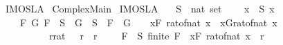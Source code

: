 %
\begin{isabellebody}%
%
%
\isadelimdocument
%
\endisadelimdocument
%
\isatagdocument
%
\isamarkuptrue%
%
\isamarkuptrue%
%
\endisatagdocument
{\isafolddocument}%
%
\isadelimdocument
%
\endisadelimdocument
%
\isadelimtheory
%
\endisadelimtheory
%
\isatagtheory
{}\isamarkupfalse%
\ IMO{\isacharunderscore}{}{}{}{}{\isacharunderscore}SL{\isacharunderscore}A{}\isanewline
{}\ Complex{\isacharunderscore}Main\isanewline
\isanewline
{}%
\endisatagtheory
{\isafoldtheory}%
%
\isadelimtheory
\isanewline
%
\endisadelimtheory
\isanewline
{}\isamarkupfalse%
\ IMO{}{}{}{}SL{\isacharunderscore}A{}{\isacharcolon}\isanewline
\ \ \ S\ {\isacharcolon}{\isacharcolon}\ {\isachardoublequoteopen}nat\ set{\isachardoublequoteclose}\isanewline
\ \ \ {\isachardoublequoteopen}{\isasymforall}\ x\ {\isasymin}\ S{\isachardot}\ x\ {\isachargreater}\ {}{\isachardoublequoteclose}\isanewline
\ \ \ {\isachardoublequoteopen}{\isacharparenleft}{\isasymexists}\ F\ G{\isachardot}\ F\ {\isasymsubseteq}\ S\ {\isasymand}\ G\ {\isasymsubseteq}\ S\ {\isasymand}\ F\ {\isasyminter}\ G\ {\isacharequal}\ {\isacharbraceleft}{\isacharbraceright}\ {\isasymand}\ {\isacharparenleft}{\isasymSum}x{\isasymin}F{\isachardot}\ {}{\isacharslash}{\isacharparenleft}rat{\isacharunderscore}of{\isacharunderscore}nat\ x{\isacharparenright}{\isacharparenright}\ {\isacharequal}\ {\isacharparenleft}{\isasymSum}x{\isasymin}G{\isachardot}{}{\isacharslash}{\isacharparenleft}rat{\isacharunderscore}of{\isacharunderscore}nat\ x{\isacharparenright}{\isacharparenright}{\isacharparenright}\ {\isasymor}\isanewline
\ \ \ \ \ \ \ \ \ {\isacharparenleft}{\isasymexists}\ r{\isacharcolon}{\isacharcolon}rat{\isachardot}\ {}\ {\isacharless}\ r\ {\isasymand}\ r\ {\isacharless}\ {}\ {\isasymand}\ {\isacharparenleft}{\isasymforall}\ F\ {\isasymsubseteq}\ S{\isachardot}\ finite\ F\ {\isasymlongrightarrow}\ {\isacharparenleft}{\isasymSum}x{\isasymin}F{\isachardot}\ {}{\isacharslash}{\isacharparenleft}rat{\isacharunderscore}of{\isacharunderscore}nat\ x{\isacharparenright}{\isacharparenright}\ {\isasymnoteq}\ r{\isacharparenright}{\isacharparenright}{\isachardoublequoteclose}\isanewline
%
\isadelimproof
\ \ %
\endisadelimproof
%
\isatagproof
{}\isamarkupfalse%
%
\endisatagproof
{\isafoldproof}%
%
\isadelimproof
\isanewline
%
\endisadelimproof
%
\isadelimtheory
\isanewline
%
\endisadelimtheory
%
\isatagtheory
{}\isamarkupfalse%
%
\endisatagtheory
{\isafoldtheory}%
%
\isadelimtheory
%
\endisadelimtheory
%
\end{isabellebody}%
